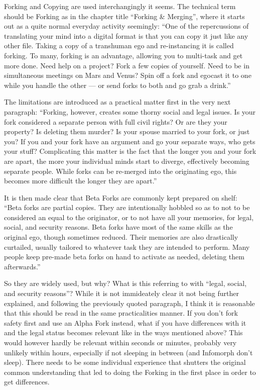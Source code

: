 Forking and Copying are used interchangingly it seems. The technical term should be Forking as in the chapter title “Forking \& Merging”, where it starts out as a quite normal everyday activity seemingly: “One of the repercussions of translating your mind into a digital format is that you can copy it just like any other file. Taking a copy of a transhuman ego and re-instancing it is called forking. To many, forking is an advantage, allowing you to multi-task and get more done. Need help on a project? Fork a few copies of yourself. Need to be in simultaneous meetings on Mars and Venus? Spin off a fork and egocast it to one while you handle the other — or send forks to both and go grab a drink.” \citep[pg. 292]{ep2e_1.1_2019}

The limitations are introduced as a practical matter first in the very next paragraph: “Forking, however, creates some thorny social and legal issues. Is your fork considered a separate person with full civil rights? Or are they your property? Is deleting them murder? Is your spouse married to your fork, or just you? If you and your fork have an argument and go your separate ways, who gets your stuff? Complicating this matter is the fact that the longer you and your fork are apart, the more your individual minds start to diverge, effectively becoming separate people. While forks can be re-merged into the originating ego, this becomes more difficult the longer they are apart.” \citep[pg. 292]{ep2e_1.1_2019}

It is then made clear that Beta Forks are commonly kept prepared on shelf: “Beta forks are partial copies. They are intentionally hobbled so as to not to be considered an equal to the originator, or to not have all your memories, for legal, social, and security reasons. Beta forks have most of the same skills as the original ego, though sometimes reduced. Their memories are also drastically curtailed, usually tailored to whatever task they are intended to perform. Many people keep pre-made beta forks on hand to activate as needed, deleting them afterwards.” \citep[pg. 292]{ep2e_1.1_2019}

So they are widely used, but why? What is this referring to with “legal, social, and security reasons”? While it is not immideately clear it not being further explained, and following the previously quoted paragraph, I think it is reasonable that this should be read in the same practicalities manner. If you don't fork safety first and use an Alpha Fork instead, what if you have differences with it and the legal status becomes relevant like in the ways mentioned above? This would however hardly be relevant within seconds or minutes, probably very unlikely within hours, especially if not sleeping in between (and Infomorph don't sleep). There needs to be some individual experience that shutters the original common understanding that led to doing the Forking in the first place in order to get differences.


